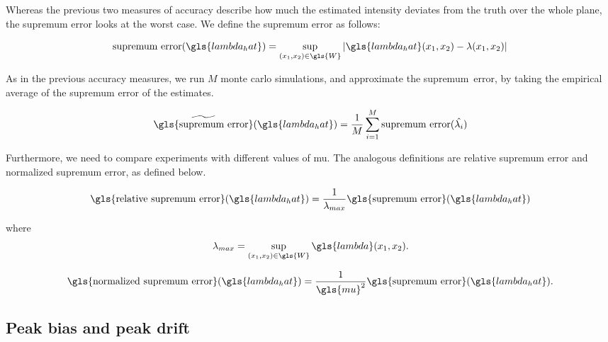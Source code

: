 Whereas the previous two measures of accuracy describe how much the estimated intensity deviates from the truth over the whole plane,
the \gls{supremum error} looks at the worst case.
We define the \gls{supremum error} as follows:

\begin{equation}
    \mbox{supremum error}(\gls{lambda_hat}) = \sup_{(x_1, x_2) \in \gls{W}}
        {\left|
            \gls{lambda_hat}(x_1, x_2) - \lambda(x_1, x_2)
        \right|}
\end{equation}

As in the previous accuracy measures, we run \(M\) monte carlo simulations, and approximate the \mbox{supremum error}, by taking the empirical average of the supremum error of the estimates.

\begin{equation}
    \widetilde{\mbox{\gls{supremum error}}}(\gls{lambda_hat}) = \frac{1}{M} \sum_{i=1}^{M} \mbox{supremum error}(\hat{\lambda_i})
\end{equation}

Furthermore, we need to compare experiments with different values of \gls{mu}.
The analogous definitions are \gls{relative supremum error} and \gls{normalized supremum error}, as defined below.

\begin{equation}
\label{eq:relative_supremum_error}
    \mbox{\gls{relative supremum error}}(\gls{lambda_hat}) = 
        \frac{1}{\lambda_{max}} \mbox{\gls{supremum error}}(\gls{lambda_hat}) \\
\end{equation}

where
\begin{equation}
\label{eq:lambda_max}
    \lambda_{max} = \sup_{(x_1, x_2) \in \gls{W}}{\gls{lambda}(x_1, x_2)} \text{.}
\end{equation}

\begin{equation}
\label{eq:normalized_supremum_error}
    \mbox{\gls{normalized supremum error}}(\gls{lambda_hat}) = 
        \frac{1}{\gls{mu}^2} \mbox{\gls{supremum error}}(\gls{lambda_hat}) \text{.}
\end{equation}

\subsection{Peak bias and peak drift}
\label{subsec:method:peak_bias}


